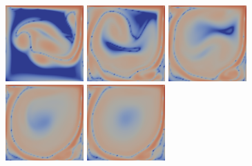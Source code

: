 \documentclass[english, nochinese]{pkupaper}
\begin{document}
\begin{figure}
{{
\includegraphics[width=3cm]{Results/Figure02f.pdf}
\includegraphics[width=3cm]{Results/Figure02g.pdf}
\includegraphics[width=3cm]{Results/Figure02h.pdf}
\includegraphics[width=3cm]{Results/Figure02i.pdf}
\includegraphics[width=3cm]{Results/Figure02j.pdf}
}

}
\end{figure}
\end{document}
